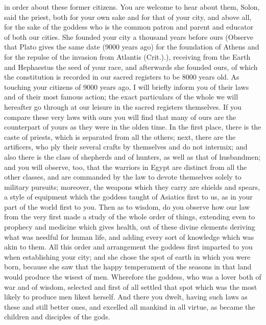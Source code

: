 in order about these former citizens. You are welcome to hear about them,
Solon, said the priest, both for your own sake and for that of your city,
and above all, for the sake of the goddess who is the common patron and
parent and educator of both our cities. She founded your city a thousand
years before ours (Observe that Plato gives the same date (9000 years ago)
for the foundation of Athens and for the repulse of the invasion from
Atlantis (Crit.).), receiving from the Earth and Hephaestus the seed of
your race, and afterwards she founded ours, of which the constitution is
recorded in our sacred registers to be 8000 years old. As touching your
citizens of 9000 years ago, I will briefly inform you of their laws and of
their most famous action; the exact particulars of the whole we will
hereafter go through at our leisure in the sacred registers themselves. If
you compare these very laws with ours you will find that many of ours are
the counterpart of yours as they were in the olden time. In the first
place, there is the caste of priests, which is separated from all the
others; next, there are the artificers, who ply their several crafts by
themselves and do not intermix; and also there is the class of shepherds
and of hunters, as well as that of husbandmen; and you will observe, too,
that the warriors in Egypt are distinct from all the other classes, and
are commanded by the law to devote themselves solely to military pursuits;
moreover, the weapons which they carry are shields and spears, a style of
equipment which the goddess taught of Asiatics first to us, as in your
part of the world first to you. Then as to wisdom, do you observe how our
law from the very first made a study of the whole order of things,
extending even to prophecy and medicine which gives health, out of these
divine elements deriving what was needful for human life, and adding every
sort of knowledge which was akin to them. All this order and arrangement
the goddess first imparted to you when establishing your city; and she
chose the spot of earth in which you were born, because she saw that the
happy temperament of the seasons in that land would produce the wisest of
men. Wherefore the goddess, who was a lover both of war and of wisdom,
selected and first of all settled that spot which was the most likely to
produce men likest herself. And there you dwelt, having such laws as these
and still better ones, and excelled all mankind in all virtue, as became
the children and disciples of the gods.

